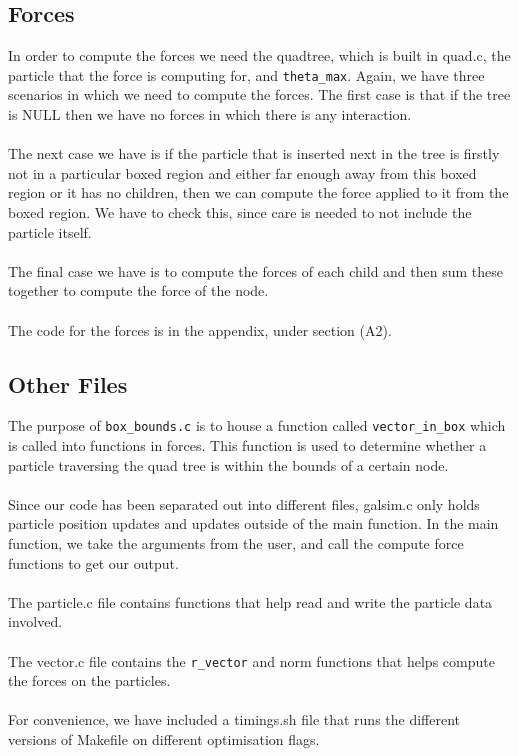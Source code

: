 \documentclass{article}
\begin{document}
\subsection{Forces}
In order to compute the forces we need the quadtree, which is built in quad.c, the particle that the force is computing for, and \verb|theta_max|. Again, we have three scenarios in which we need to compute the forces. The first case is that if the tree is NULL then we have no forces in which there is any interaction. 
\\\\
The next case we have is if the particle that is inserted next in the tree is firstly not in a particular boxed region and either far enough away from this boxed region or it has no children, then we can compute the force applied to it from the boxed region. We have to check this, since care is needed to not include the particle itself. \\\\
The final case we have is to compute the forces of each child and then sum these together to compute the force of the node. 
\\\\
The code for the forces is in the appendix, under section (A2).

\subsection{Other Files}
The purpose of \verb|box_bounds.c| is to house a function called \verb|vector_in_box| which is called into functions in forces. This function is used to determine whether a particle traversing the quad tree is within the bounds of a certain node. 
\\\\
Since our code has been separated out into different files, galsim.c only holds particle position updates and updates outside of the main function. In the main function, we take the arguments from the user, and call the compute force functions to get our output. 
\\\\
The particle.c file contains functions that help read and write the particle data involved.
\\\\
The vector.c file contains the \verb|r_vector| and norm functions that helps compute the forces on the particles. 
\\\\
For convenience, we have included a timings.sh file that runs the different versions of Makefile on different optimisation flags.
\newpage
\end{document}
